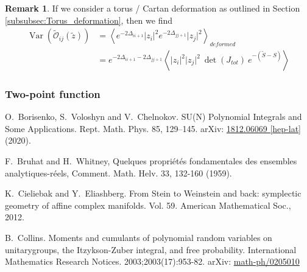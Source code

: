 \documentclass[a4paper,11pt]{article}
\theoremstyle{definition}
\newtheorem{remark}{Remark}
\DeclareMathOperator{\Var}{Var}
\newcommand{\OO}{\mathcal O}
\begin{document}
\begin{remark}
  If we consider a torus / Cartan deformation as outlined in Section \ref{subsubsec:Torus_deformation}, then we find 
  \begin{equation}
    \begin{split} 
      \Var(\widetilde{\OO}_{ij}(\tilde z)) &= \left\langle e^{-2\Delta_{ii+1}}\lvert z_i \rvert^2 e^{-2\Delta_{jj+1}}\lvert z_j \rvert^2 \right\rangle_{deformed}\\
      &=  e^{-2\Delta_{ii+1} -2\Delta_{jj+1}} \left\langle  \lvert z_i \rvert^2\lvert z_j \rvert^2\ \det(J_{tot})\ e^{-(\tilde S - S)}\right\rangle 
    \end{split}
  \end{equation}
\end{remark}

\subsubsection{Two-point function}
\begin{thebibliography}{99}
   O.\ Borisenko, S.\  Voloshyn and V.\ Chelnokov. SU(N) Polynomial Integrals and Some Applications. Rept. Math. Phys. 85, 129–145. arXiv: \href{https://arxiv.org/abs/1812.06069}{1812.06069 [hep-lat]} (2020).

   F.\ Bruhat and H.\ Whitney, Quelques propri\'et\'es fondamentales des ensembles analytiques-r\'eels, Comment. Math. Helv. 33, 132-160 (1959).

   K.\ Cieliebak and Y.\ Eliashberg. From Stein to Weinstein and back: symplectic geometry of affine complex manifolds. Vol. 59. American Mathematical Soc., 2012.

   B.\ Collins. Moments and cumulants of polynomial random variables on unitarygroups, the Itzykson-Zuber integral, and free probability. International Mathematics Research Notices. 2003;2003(17):953-82. arXiv: \href{https://arxiv.org/abs/math-ph/0205010v2}{math-ph/0205010}
  
\end{thebibliography}
\end{document}
